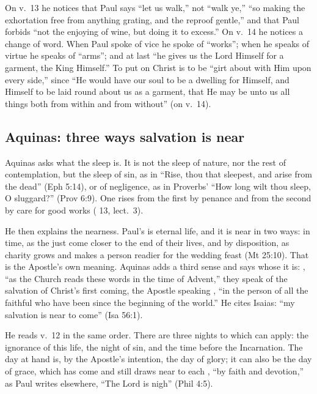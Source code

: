 On v.~13 he notices that Paul says ``let us walk,'' not ``walk ye,'' ``so
making the exhortation free from anything grating, and the reproof gentle,''
and that Paul forbids ``not the enjoying of wine, but doing it to excess.'' On
v.~14 he notices a change of word. When Paul spoke of vice he spoke of
``works''; when he speaks of virtue he speaks of ``arms''; and at last ``he gives
us the Lord Himself for a garment, the King Himself.'' To put on Christ is to
be ``girt about with Him upon every side,'' since ``He would have our soul to
be a dwelling for Himself, and Himself to be laid round about us as a
garment, that He may be unto us all things both from within and from
without'' (on v.~14).

\subsection{Aquinas: three ways salvation is near}

Aquinas asks what the sleep is. It is not the sleep of nature, nor the rest of
contemplation, but the sleep of sin, as in ``Rise, thou that sleepest, and
arise from the dead'' (Eph 5:14), or of negligence, as in Proverbs' ``How
long wilt thou sleep, O sluggard?'' (Prov 6:9). One rises from the first by
penance and from the second by care for good works ( 13, lect.~3).

He then explains the nearness. Paul's  is eternal life, and it
is near in two ways: in time, as the just come closer to the end of their
lives, and by disposition, as charity grows and makes a person readier for
the wedding feast (Mt 25:10). That is the Apostle's own meaning. Aquinas adds
a third sense and says whose it is: , ``as the Church reads these words in the time of
Advent,'' they speak of the salvation of Christ's first coming, the Apostle
speaking , ``in
the person of all the faithful who have been since the beginning of the
world.'' He cites Isaias: ``my salvation is near to come'' (Isa 56:1).

He reads v.~12 in the same order. There are three nights to which
 can apply: the ignorance of this life, the night of sin,
and the time before the Incarnation. The day at hand is, by the Apostle's
intention, the day of glory; it can also be the day of grace, which has come
and still draws near to each , ``by faith and
devotion,'' as Paul writes elsewhere, ``The Lord is nigh'' (Phil 4:5).

